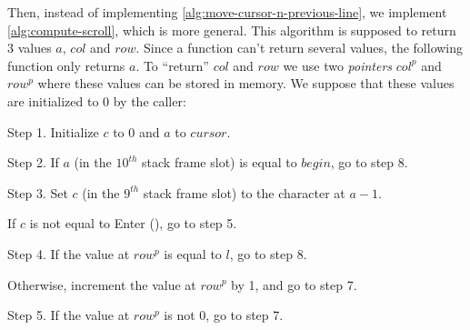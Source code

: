 Then, instead of implementing \cref{alg:move-cursor-n-previous-line}, we
implement \cref{alg:compute-scroll}, which is more general. This algorithm is
supposed to return 3 values $a$, $col$ and $row$. Since a function can't return
several values, the following function only returns $a$. To ``return'' $col$
and $row$ we use two {\em pointers} $col^p$ and $row^p$ where these values can
be stored in memory. We suppose that these values are initialized to 0 by the
caller:

\begin{Paragraph}
\begin{paracol}{2}

Step 1. Initialize $c$ to 0 and $a$ to $cursor$.


Step 2. If $a$ (in the $10^{th}$ stack frame slot) is equal to $begin$, go to
step 8.


Step 3. Set $c$ (in the $9^{th}$ stack frame slot) to the character at $a-1$.


If $c$ is not equal to Enter (), go to step 5.


Step 4. If the value at $row^p$ is equal to $l$, go to step 8.


Otherwise, increment the value at $row^p$ by 1, and go to step 7.


Step 5. If the value at $row^p$ is not 0, go to step 7.


\end{paracol}
\end{Paragraph}
